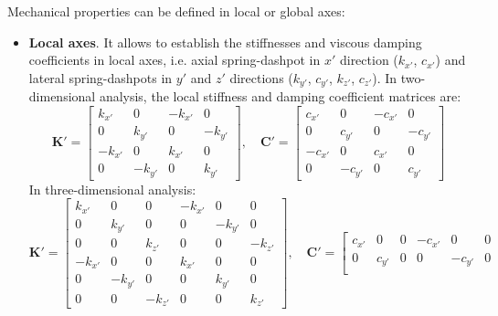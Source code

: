 \documentclass[a4paper,fleqn]{book}
\begin{document}
Mechanical properties can be defined in local or global axes:
\begin{itemize}
    \item \textbf{Local axes}. It allows to establish the stiffnesses and viscous damping coefficients in local axes, i.e. axial spring-dashpot in $x'$ direction ($k_{x'}$, $c_{x'}$) and lateral spring-dashpots in $y'$ and $z'$ directions ($k_{y'}$, $c_{y'}$, $k_{z'}$, $c_{z'}$). In two-dimensional analysis, the local stiffness and damping coefficient matrices are:
    \begin{equation}
    \mathbf{K}'
    =
    \left[
    \begin{array}{cccc}
    k_{x'} & 0      & -k_{x'} &       0 \\
    0      & k_{y'} &       0 & -k_{y'} \\
    -k_{x'} &  0    & k_{x'} &      0 \\
        0 & -k_{y'} &      0 & k_{y'}
    \end{array}
    \right],
    \quad
    \mathbf{C}'
    =
    \left[
    \begin{array}{cccc}
    c_{x'} & 0      & -c_{x'} &       0 \\
    0      & c_{y'} &       0 & -c_{y'} \\
    -c_{x'} &  0    & c_{x'} &      0 \\
        0 & -c_{y'} &      0 & c_{y'}
    \end{array}
    \right]
    \end{equation}
    In three-dimensional analysis:
    \begin{equation}
    \mathbf{K}'
    =
    \left[
    \begin{array}{cccccc}
    k_{x'} & 0      & 0      & -k_{x'} &       0 & 0 \\
    0      & k_{y'} & 0      &       0 & -k_{y'} & 0 \\
    0      & 0      & k_{z'} &       0 &       0 & -k_{z'} \\
    -k_{x'} &       0 & 0       & k_{x'} &      0 & 0 \\
        0 & -k_{y'} & 0       &      0 & k_{y'} & 0 \\
        0 &       0 & -k_{z'} &      0 &      0 & k_{z'}
    \end{array}
    \right],
    \quad
    \mathbf{C}'
    =
    \left[
    \begin{array}{cccccc}
    c_{x'} & 0      & 0      & -c_{x'} &       0 & 0 \\
    0      & c_{y'} & 0      &       0 & -c_{y'} & 0 \\

\end{array}
\end{equation}
\end{itemize}
\end{document}
